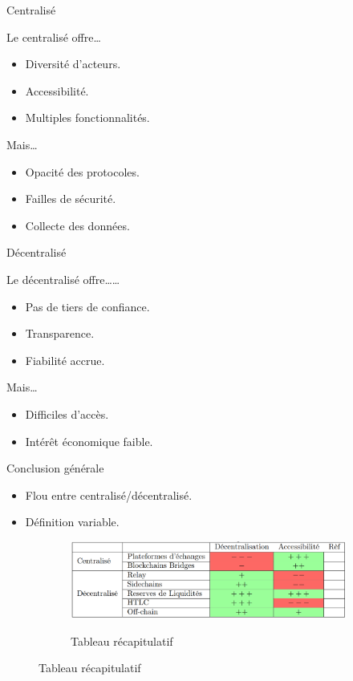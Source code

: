 \begin{frame}{Centralisé}
    \begin{block}{Le centralisé offre\dots}
        \begin{itemize}
            \item Diversité d'acteurs.
            \item Accessibilité.
            \item Multiples fonctionnalités.
        \end{itemize}
    \end{block}
    \pause
    \begin{block}{Mais\dots}
        \begin{itemize}
            \item Opacité des protocoles.
            \item Failles de sécurité.
            \item Collecte des données.
        \end{itemize}
    \end{block}
\end{frame}


\begin{frame}{Décentralisé}
    \begin{block}{Le décentralisé offre\dots\dots}
        \begin{itemize}
            \item Pas de tiers de confiance.
            \item Transparence.
            \item Fiabilité accrue.
        \end{itemize}
    \end{block}
    \pause
    \begin{block}{Mais\dots}
        \begin{itemize}
            \item Difficiles d'accès.
            \item Intérêt économique faible.
        \end{itemize}
    \end{block}
\end{frame}

\begin{frame}{Conclusion générale}
    \begin{itemize}
        \item Flou entre centralisé/décentralisé.
        \item Définition variable.
    \end{itemize}
\end{frame}

\begin{frame}
    \begin{figure}
        \begin{figure}
            \centering
            \includegraphics[scale = 0.2]{conclusion/tableau.png}
            \label{fig:recap}
            \caption{Tableau récapitulatif}
        \end{figure}
    \end{figure}
    
\end{frame}